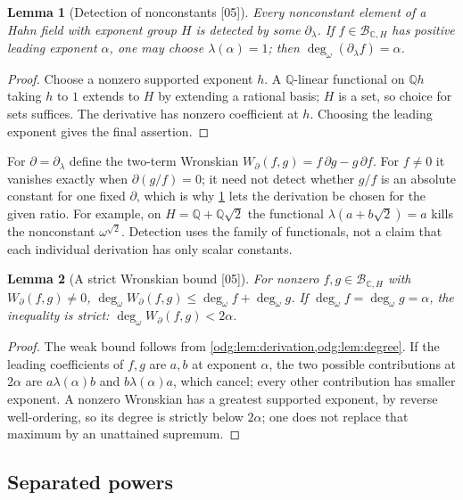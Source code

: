 \documentclass[11pt,oneside]{article}
\numberwithin{equation}{section}
\newtheorem{lemma}[lemma]{Lemma}
\theoremstyle{definition}
\theoremstyle{remark}
\newcommand{\Q}{\mathbb Q}
\newcommand{\C}{\mathbb C}
\newcommand{\ddeg}{\operatorname{deg}_{\omega}}
\newcommand{\src}[1]{\textup{\textsf{\small[#1]}}}
\begin{document}
\begin{lemma}[Detection of nonconstants \src{05}]\label{odg:lem:detection}
Every nonconstant element of a Hahn field with exponent group $H$ is
detected by some $\partial_\lambda$. If $f\in\mathcal B_{\C,H}$ has positive
leading exponent $\alpha$, one may choose $\lambda(\alpha)=1$; then
$\ddeg(\partial_\lambda f)=\alpha$.
\end{lemma}
\begin{proof}
Choose a nonzero supported exponent $h$. A $\Q$-linear functional on $\Q h$
taking $h$ to $1$ extends to $H$ by extending a rational basis; $H$ is a
set, so choice for sets suffices. The derivative has nonzero coefficient at
$h$. Choosing the leading exponent gives the final assertion.
\end{proof}

For $\partial=\partial_\lambda$ define the two-term Wronskian
$W_\partial(f,g)=f\,\partial g-g\,\partial f$. For $f\ne0$ it vanishes exactly
when $\partial(g/f)=0$; it need not detect whether $g/f$ is an absolute
constant for one fixed $\partial$, which is why \cref{odg:lem:detection}
lets the derivation be chosen for the given ratio. For example, on
$H=\Q+\Q\sqrt2$ the functional $\lambda(a+b\sqrt2)=a$ kills the nonconstant
$\omega^{\sqrt2}$. Detection uses the family of functionals, not a claim
that each individual derivation has only scalar constants.

\begin{lemma}[A strict Wronskian bound \src{05}]\label{odg:lem:wronskian}
For nonzero $f,g\in\mathcal B_{\C,H}$ with $W_\partial(f,g)\ne0$,
$\ddeg W_\partial(f,g)\le\ddeg f+\ddeg g$. If $\ddeg f=\ddeg g=\alpha$, the
inequality is strict: $\ddeg W_\partial(f,g)<2\alpha$.
\end{lemma}
\begin{proof}
The weak bound follows from \cref{odg:lem:derivation,odg:lem:degree}. If the
leading coefficients of $f,g$ are $a,b$ at exponent $\alpha$, the two
possible contributions at $2\alpha$ are $a\lambda(\alpha)b$ and
$b\lambda(\alpha)a$, which cancel; every other contribution has smaller
exponent. A nonzero Wronskian has a greatest supported exponent, by reverse
well-ordering, so its degree is strictly below $2\alpha$; one does not replace
that maximum by an unattained supremum.
\end{proof}

\subsection{Separated powers}
\end{document}
